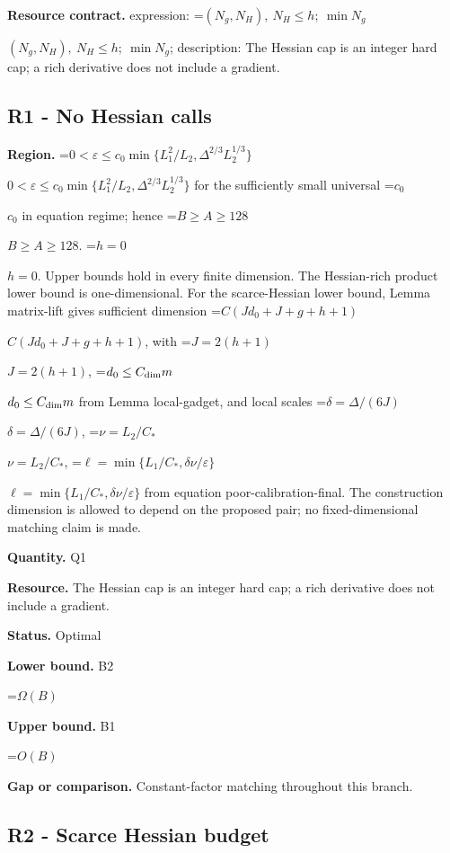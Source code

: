 \documentclass[10pt,a4paper]{article}
\newcommand{\AtlasMath}[1]{\par\begingroup\centering\setbox0=\hbox{$\displaystyle #1$}\ifdim\wd0>1.4\linewidth\typeout{ATLAS WIDE FORMULA: \the\wd0}\fi\ifdim\wd0>\linewidth\resizebox{\linewidth}{!}{\box0}\else\box0\fi\par\endgroup}
\newcommand{\AtlasInlineMath}[1]{\begingroup\setbox0=\hbox{$#1$}\ifdim\wd0>.4\linewidth\endgroup\AtlasMath{#1}\else\endgroup$#1$\fi}
\begin{document}
\textbf{Resource contract.} expression: \AtlasInlineMath{(N_g,N_H),\ N_H\le h;\ \min N_g}; description: The Hessian cap is an integer hard cap; a rich derivative does not include a gradient.



\subsection{R1 - No Hessian calls}


\textbf{Region.} \AtlasInlineMath{0<\varepsilon\le c_0\min\{L_1^2/L_2,\Delta^{2/3}L_2^{1/3}\}} for the sufficiently small universal \AtlasInlineMath{c_0} in equation regime; hence \AtlasInlineMath{B\ge A\ge128}. \AtlasInlineMath{h=0}. Upper bounds hold in every finite dimension. The Hessian-rich product lower bound is one-dimensional. For the scarce-Hessian lower bound, Lemma matrix-lift gives sufficient dimension \AtlasInlineMath{C(Jd_0+J+g+h+1)}, with \AtlasInlineMath{J=2(h+1)}, \AtlasInlineMath{d_0\le C_{\rm dim}m} from Lemma local-gadget, and local scales \AtlasInlineMath{\delta=\Delta/(6J)}, \AtlasInlineMath{\nu=L_2/C_*}, \AtlasInlineMath{\ell=\min\{L_1/C_*,\delta\nu/\varepsilon\}} from equation poor-calibration-final. The construction dimension is allowed to depend on the proposed pair; no fixed-dimensional matching claim is made.



\textbf{Quantity.} Q1



\textbf{Resource.} The Hessian cap is an integer hard cap; a rich derivative does not include a gradient.



\textbf{Status.} Optimal



\textbf{Lower bound.} B2



\AtlasMath{\Omega\!\left(B\right)}


\textbf{Upper bound.} B1



\AtlasMath{O\!\left(B\right)}


\textbf{Gap or comparison.} Constant-factor matching throughout this branch.



\subsection{R2 - Scarce Hessian budget}
\end{document}
